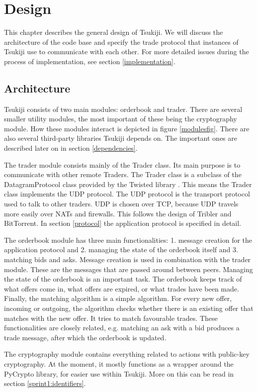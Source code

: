 \section{Design}
This chapter describes the general design of Tsukiji.
We will discuss the architecture of the code base and specify the trade protocol that instances of Tsukiji use to communicate with each other.
For more detailed issues during the process of implementation, see section \ref{implementation}.

\subsection{Architecture}
Tsukiji consists of two main modules: orderbook and trader.
There are several smaller utility modules, the most important of these being the cryptography module.
How these modules interact is depicted in figure \ref{modulesfig}.
There are also several third-party libraries Tsukiji depends on.
The important ones are described later on in section \ref{dependencies}.

The trader module consists mainly of the Trader class.
Its main purpose is to communicate with other remote Traders.
The Trader class is a subclass of the DatagramProtocol class provided by the Twisted library \cite{twisted}.
This means the Trader class implements the UDP protocol.
The UDP protocol is the transport protocol used to talk to other traders.
UDP is chosen over TCP, because UDP travels more easily over NATs and firewalls.
This follows the design of Tribler and BitTorrent.
In section \ref{protocol} the application protocol is specified in detail.

The orderbook module has three main functionalities: 1. message creation for the application protocol and 2. managing the state of the orderbook itself and 3. matching bids and asks.
Message creation is used in combination with the trader module.
These are the messages that are passed around between peers.
Managing the state of the orderbook is an important task.
The orderbook keeps track of what offers come in, what offers are expired, or what trades have been made.
Finally, the matching algorithm is a simple algorithm.
For every new offer, incoming or outgoing, the algorithm checks whether there is an existing offer that matches with the new offer.
It tries to match favourable trades.
These functionalities are closely related, e.g. matching an ask with a bid produces a trade message, after which the orderbook is updated.

The cryptography module contains everything related to actions with public-key cryptography.
At the moment, it mostly functions as a wrapper around the PyCrypto library, for easier use within Tsukiji.
More on this can be read in section \ref{sprint1:identifiers}.

